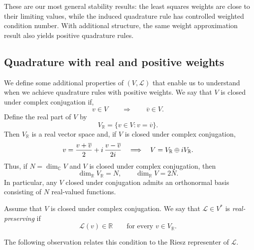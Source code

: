 \documentclass[10pt,dvipsnames]{amsart}
\begin{document}
These are our most general stability results: the least squares weights are close
to their limiting values, while the induced quadrature rule has controlled
weighted condition number. With additional structure, the same weight
approximation result also yields positive quadrature rules.

\subsection{Quadrature with real and positive weights}
We define some additional properties of $(V,\mathcal{L})$ that enable us to
understand when we achieve quadrature rules with positive weights.
We say that 
\(V\) is closed under complex conjugation if,
\[
    v\in V
    \qquad\Longrightarrow\qquad
    \overline v\in V .
\]
Define the real part of \(V\) by
\begin{equation}
\label{eq:VR-def}
    V_{\mathbb R}
    =
    \{v\in V: v=\overline v\}.
\end{equation}
Then \(V_{\mathbb R}\) is a real vector space and, if $V$ is closed under complex conjugation,
\[
    v
    =
    \frac{v+\overline v}{2}
    +
    i\,\frac{v-\overline v}{2i} \hskip 10pt \Longrightarrow \hskip 10pt
    V = V_{\mathbb R}\oplus iV_{\mathbb R}.
\]
Thus, if \(N=\dim_{\mathbb C}V\) and $V$ is closed under complex conjugation, then
\[
    \dim_{\mathbb R}V_{\mathbb R}=N,
    \qquad
    \dim_{\mathbb R}V=2N.
\]
In particular, any \(V\) closed under conjugation admits an orthonormal basis
consisting of $N$ real-valued functions.

\begin{definition}
\label{def:real-preserving}
Assume that \(V\) is closed under complex conjugation.  We say that
\(\mathcal L\in V^*\) is \emph{real-preserving} if
\[
    \mathcal L(v)\in\mathbb R
    \qquad
    \text{for every }v\in V_{\mathbb R}.
\]
\end{definition}

The following observation relates this condition to the Riesz
representer of \(\mathcal L\).
\end{document}
